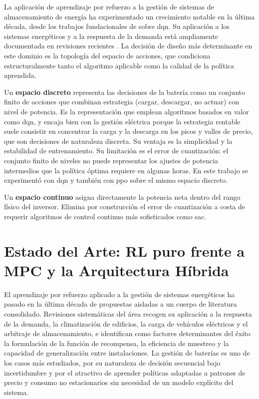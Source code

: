 \documentclass[12pt, a4paper, twoside]{report}
\begin{document}
La aplicación de aprendizaje por refuerzo a la gestión de sistemas de
almacenamiento de energía ha experimentado un crecimiento notable en la última
década, desde los trabajos fundacionales de \citet{Mnih2015} sobre
\acrshort{dqn}. Su aplicación a los sistemas energéticos y a la respuesta de
la demanda está ampliamente documentada en revisiones recientes
\citep{Perera2021, Vazquez2019}. La decisión de diseño más determinante en este dominio es la
topología del espacio de acciones, que condiciona estructuralmente tanto el
algoritmo aplicable como la calidad de la política aprendida.

Un \textbf{espacio discreto} representa las decisiones de la batería como un
conjunto finito de acciones que combinan estrategia (cargar, descargar, no
actuar) con nivel de potencia. Es la representación que emplean algoritmos
basados en valor como \acrshort{dqn}, y encaja bien con la gestión eléctrica
porque la estrategia rentable suele consistir en concentrar la carga y la
descarga en los picos y valles de precio, que son decisiones de naturaleza
discreta. Su ventaja es la simplicidad y la estabilidad de entrenamiento. Su
limitación es el error de cuantización: el conjunto finito de niveles no puede
representar los ajustes de potencia intermedios que la política óptima requiere
en algunas horas. En este trabajo se experimentó con \acrshort{dqn} y también
con \acrshort{ppo} sobre el mismo espacio discreto.

Un \textbf{espacio continuo} asigna directamente la potencia neta dentro del
rango físico del inversor. Elimina por construcción el error de cuantización a
costa de requerir algoritmos de control continuo más sofisticados como
\acrshort{sac}.

\section{Estado del Arte: RL puro frente a MPC y la Arquitectura Híbrida}

El aprendizaje por refuerzo aplicado a la gestión de sistemas energéticos ha
pasado en la última década de propuestas aisladas a un cuerpo de literatura
consolidado. Revisiones sistemáticas del área \citep{Perera2021, Vazquez2019}
recogen su aplicación a la respuesta de la demanda, la climatización de
edificios, la carga de vehículos eléctricos y el arbitraje de almacenamiento, e
identifican como factores determinantes del éxito la formulación de la función
de recompensa, la eficiencia de muestreo y la capacidad de generalización entre
instalaciones. La gestión de baterías es uno de los casos más estudiados, por su
naturaleza de decisión secuencial bajo incertidumbre y por el atractivo de
aprender políticas adaptadas a patrones de precio y consumo no estacionarios sin
necesidad de un modelo explícito del sistema.
\end{document}
